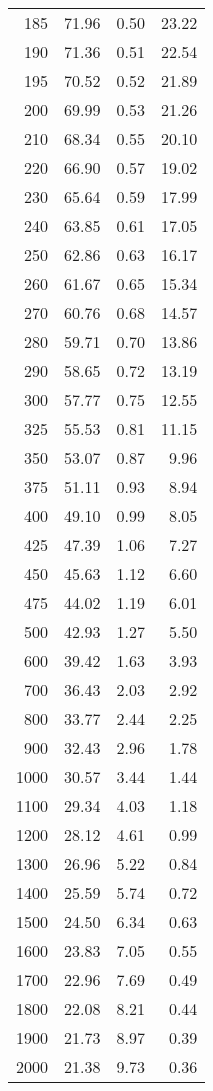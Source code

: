 \begin{table}[ht]
\begin{tabular}{rrrr}
   185 & 71.96 & 0.50 & 23.22 \\ 
   190 & 71.36 & 0.51 & 22.54 \\ 
   195 & 70.52 & 0.52 & 21.89 \\ 
   200 & 69.99 & 0.53 & 21.26 \\ 
   210 & 68.34 & 0.55 & 20.10 \\ 
   220 & 66.90 & 0.57 & 19.02 \\ 
   230 & 65.64 & 0.59 & 17.99 \\ 
   240 & 63.85 & 0.61 & 17.05 \\ 
   250 & 62.86 & 0.63 & 16.17 \\ 
   260 & 61.67 & 0.65 & 15.34 \\ 
   270 & 60.76 & 0.68 & 14.57 \\ 
   280 & 59.71 & 0.70 & 13.86 \\ 
   290 & 58.65 & 0.72 & 13.19 \\ 
   300 & 57.77 & 0.75 & 12.55 \\ 
   325 & 55.53 & 0.81 & 11.15 \\ 
   350 & 53.07 & 0.87 & 9.96 \\ 
   375 & 51.11 & 0.93 & 8.94 \\ 
   400 & 49.10 & 0.99 & 8.05 \\ 
   425 & 47.39 & 1.06 & 7.27 \\ 
   450 & 45.63 & 1.12 & 6.60 \\ 
   475 & 44.02 & 1.19 & 6.01 \\ 
   500 & 42.93 & 1.27 & 5.50 \\ 
   600 & 39.42 & 1.63 & 3.93 \\ 
   700 & 36.43 & 2.03 & 2.92 \\ 
   800 & 33.77 & 2.44 & 2.25 \\ 
   900 & 32.43 & 2.96 & 1.78 \\ 
  1000 & 30.57 & 3.44 & 1.44 \\ 
  1100 & 29.34 & 4.03 & 1.18 \\ 
  1200 & 28.12 & 4.61 & 0.99 \\ 
  1300 & 26.96 & 5.22 & 0.84 \\ 
  1400 & 25.59 & 5.74 & 0.72 \\ 
  1500 & 24.50 & 6.34 & 0.63 \\ 
  1600 & 23.83 & 7.05 & 0.55 \\ 
  1700 & 22.96 & 7.69 & 0.49 \\ 
  1800 & 22.08 & 8.21 & 0.44 \\ 
  1900 & 21.73 & 8.97 & 0.39 \\ 
  2000 & 21.38 & 9.73 & 0.36 \\ 
   \hline
\end{tabular}
\end{table}
